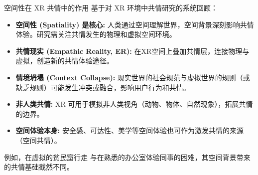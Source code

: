 \documentclass[aspectratio=169,xcolor=dvipsnames]{beamer}
\begin{document}
\begin{frame}{空间性在 XR 共情中的作用}
    基于对 XR 环境中共情研究的系统回顾：
    \begin{itemize}
        \item \textbf{空间性 (Spatiality) 是核心:} 人类通过空间理解世界，空间背景深刻影响共情体验。研究需关注共情发生的\alert{物理和虚拟空间环境}。
        \item \textbf{共情现实 (Empathic Reality, ER):} 在XR空间上叠加共情层，连接物理与虚拟，创造新的共情体验途径。
        \item \textbf{情境坍塌 (Context Collapse):} 现实世界的社会规范与虚拟世界的规则（或缺乏规则）可能发生冲突或融合，影响用户行为和共情。
        \item \textbf{非人类共情:} XR 可用于模拟非人类视角（动物、物体、自然现象），拓展共情的边界。
        \item \textbf{空间体验本身:} 安全感、可达性、美学等空间体验也可作为激发共情的来源（空间共情）。
    \end{itemize}
     \begin{examples}
        例如，在虚拟的贫民窟行走 \cite{paananen2022digital} 与在熟悉的办公室体验同事的困难，其空间背景带来的共情基础截然不同。
    \end{examples}
\end{frame}
\end{document}
